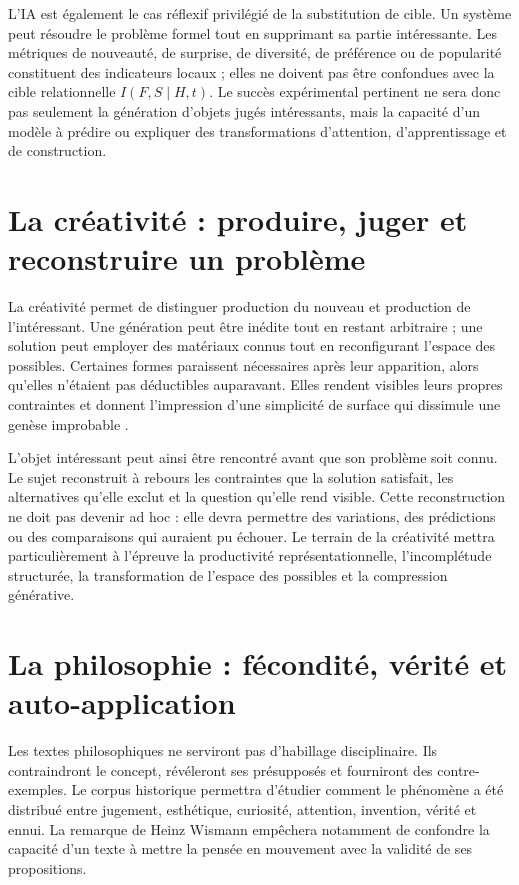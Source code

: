 \documentclass[11pt,a4paper]{article}
\begin{document}
L'IA est également le cas réflexif privilégié de la substitution de cible. Un
système peut résoudre le problème formel tout en supprimant sa
partie intéressante. Les métriques de nouveauté, de surprise, de diversité, de
préférence ou de popularité constituent des indicateurs locaux ; elles ne
doivent pas être confondues avec la cible relationnelle
\(I(F,S\mid H,t)\). Le succès expérimental pertinent ne sera donc pas seulement
la génération d'objets jugés intéressants, mais la capacité d'un modèle à
prédire ou expliquer des transformations d'attention, d'apprentissage et de
construction.

\section{La créativité : produire, juger et reconstruire un problème}

La créativité permet de distinguer production du nouveau et production de
l'intéressant. Une génération peut être inédite tout en restant arbitraire ;
une solution peut employer des matériaux connus tout en reconfigurant l'espace
des possibles. Certaines formes paraissent nécessaires après leur apparition,
alors qu'elles n'étaient pas déductibles auparavant. Elles rendent visibles
leurs propres contraintes et donnent l'impression d'une simplicité de surface
qui dissimule une genèse improbable
\parencite{pachet2026impossibilite,pachet2027virtuosite}.

L'objet intéressant peut ainsi être rencontré avant que son problème soit
connu. Le sujet reconstruit à rebours les contraintes que la solution satisfait,
les alternatives qu'elle exclut et la question qu'elle rend visible. Cette
reconstruction ne doit pas devenir ad hoc : elle devra permettre des variations,
des prédictions ou des comparaisons qui auraient pu échouer. Le terrain de la
créativité mettra particulièrement à l'épreuve la productivité
représentationnelle, l'incomplétude structurée, la transformation de l'espace
des possibles et la compression générative.

\section{La philosophie : fécondité, vérité et auto-application}

Les textes philosophiques ne serviront pas d'habillage disciplinaire. Ils
contraindront le concept, révéleront ses présupposés et fourniront des
contre-exemples. Le corpus historique permettra d'étudier comment le phénomène a
été distribué entre jugement, esthétique, curiosité, attention, invention,
vérité et ennui. La remarque de Heinz Wismann empêchera notamment de confondre
la capacité d'un texte à mettre la pensée en mouvement avec la validité de ses
propositions.
\end{document}
